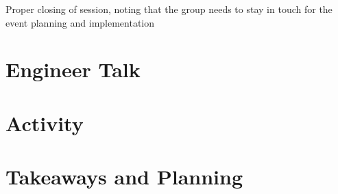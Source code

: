 \documentclass[letterpaper,10pt,english]{jupyterBook}
\begin{document}
\sphinxAtStartPar
Proper closing of session, noting that the group needs to stay in touch for the event planning and implementation

\sphinxstepscope


\section{Engineer Talk}
\label{\detokenize{session4/details/session-concepts:engineer-talk}}\label{\detokenize{session4/details/session-concepts::doc}}
\sphinxstepscope


\section{Activity}
\label{\detokenize{session4/details/activity:activity}}\label{\detokenize{session4/details/activity::doc}}
\sphinxstepscope


\section{Takeaways and Planning}
\label{\detokenize{session4/details/takeaways-and-planning:takeaways-and-planning}}\label{\detokenize{session4/details/takeaways-and-planning::doc}}






\renewcommand{\indexname}{Index}
\printindex
\end{document}
